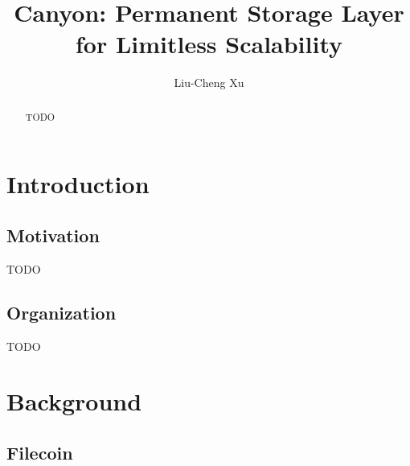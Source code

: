 \documentclass[]{article}
\title{Canyon: Permanent Storage Layer for Limitless Scalability}
\author{Liu-Cheng Xu}
\date{}
\begin{document}
\maketitle

\begin{abstract}

    TODO

\end{abstract}

\tableofcontents

\newpage

\section{Introduction}

\subsection{Motivation}

TODO

\subsection{Organization}

TODO

\section{Background}

\subsection{Filecoin}

\end{document}
